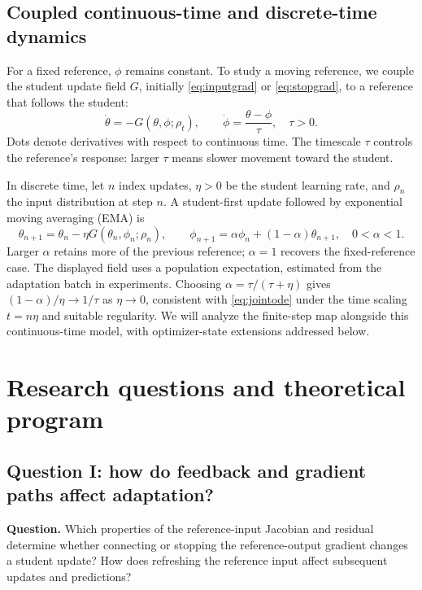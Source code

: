 \documentclass[11pt,a4paper]{article}
\begin{document}
\subsection{Coupled continuous-time and discrete-time dynamics}
For a fixed reference, $\phi$ remains constant. To study a moving reference, we couple the student update field $G$, initially \eqref{eq:inputgrad} or \eqref{eq:stopgrad}, to a reference that follows the student:
\begin{equation}
\boxed{\quad \dot\theta=-G(\theta,\phi;\rho_t),\qquad
\dot\phi=\frac{\theta-\phi}{\tau},\quad \tau>0.\quad}
\label{eq:jointode}
\end{equation}
Dots denote derivatives with respect to continuous time. The timescale $\tau$ controls the reference's response: larger $\tau$ means slower movement toward the student.

In discrete time, let $n$ index updates, $\eta>0$ be the student learning rate, and $\rho_n$ the input distribution at step $n$. A student-first update followed by exponential moving averaging (EMA) is
\begin{equation}
\theta_{n+1}=\theta_n-\eta G(\theta_n,\phi_n;\rho_n),\qquad
\phi_{n+1}=\alpha\phi_n+(1-\alpha)\theta_{n+1},\quad 0<\alpha<1.
\label{eq:jointdiscrete}
\end{equation}
Larger $\alpha$ retains more of the previous reference; $\alpha=1$ recovers the fixed-reference case. The displayed field uses a population expectation, estimated from the adaptation batch in experiments. Choosing $\alpha=\tau/(\tau+\eta)$ gives $(1-\alpha)/\eta\to1/\tau$ as $\eta\to0$, consistent with \eqref{eq:jointode} under the time scaling $t=n\eta$ and suitable regularity. We will analyze the finite-step map alongside this continuous-time model, with optimizer-state extensions addressed below.

\section{Research questions and theoretical program}
\label{sec:questions}

\subsection{Question I: how do feedback and gradient paths affect adaptation?}
\textbf{Question.} Which properties of the reference-input Jacobian and residual determine whether connecting or stopping the reference-output gradient changes a student update? How does refreshing the reference input affect subsequent updates and predictions?
\end{document}
